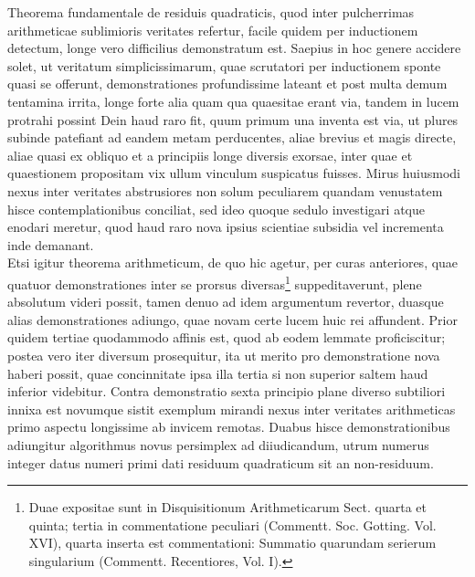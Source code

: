 \documentclass[twoside,12pt]{memoir}
\begin{document}
Theorema fundamentale de residuis quadraticis, quod inter pulcherrimas arithmeticae sublimioris veritates refertur, facile quidem per inductionem detectum, longe vero difficilius demonstratum est. Saepius in hoc genere accidere solet, ut veritatum simplicissimarum, quae scrutatori per inductionem sponte quasi se offerunt, demonstrationes profundissime lateant et post multa demum tentamina irrita, longe forte alia quam qua quaesitae erant via, tandem in lucem protrahi possint Dein haud raro fit, quum primum una inventa est via, ut plures subinde patefiant ad eandem metam perducentes, aliae brevius et magis directe, aliae quasi ex obliquo et a principiis longe diversis exorsae, inter quae et quaestionem propositam vix ullum vinculum suspicatus fuisses. Mirus huiusmodi nexus inter veritates abstrusiores non solum peculiarem quandam venustatem hisce contemplationibus conciliat, sed ideo quoque sedulo investigari atque enodari meretur, quod haud raro nova ipsius scientiae subsidia vel incrementa inde demanant.\\

Etsi igitur theorema arithmeticum, de quo hic agetur, per curas anteriores, quae quatuor demonstrationes inter se prorsus diversas\footnote{Duae expositae sunt in Disquisitionum Arithmeticarum Sect. quarta et quinta; tertia in commentatione peculiari (Commentt. Soc. Gotting. Vol. XVI), quarta inserta est commentationi: Summatio quarundam serierum singularium (Commentt. Recentiores, Vol. I).} suppeditaverunt, plene\pagebreak%
absolutum videri possit, tamen denuo ad idem argumentum revertor, duasque alias demonstrationes adiungo, quae novam certe lucem huic rei affundent. Prior quidem tertiae quodammodo affinis est, quod ab eodem lemmate proficiscitur; postea vero iter diversum prosequitur, ita ut merito pro demonstratione nova haberi possit, quae concinnitate ipsa illa tertia si non superior saltem haud inferior videbitur. Contra demonstratio sexta principio plane diverso subtiliori innixa est novumque sistit exemplum mirandi nexus inter veritates arithmeticas primo aspectu longissime ab invicem remotas. Duabus hisce demonstrationibus adiungitur algorithmus novus persimplex ad diiudicandum, utrum numerus integer datus numeri primi dati residuum quadraticum sit an non-residuum.\\
\end{document}
